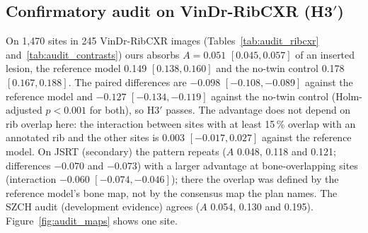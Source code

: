 \subsection{Confirmatory audit on VinDr-RibCXR (\texorpdfstring{H3$'$}{H3'})}
On 1,470 sites in 245 VinDr-RibCXR images (Tables~\ref{tab:audit_ribcxr} and~\ref{tab:audit_contrasts}) ours absorbs $A=0.051$
$[0.045,0.057]$ of an inserted lesion, the reference model 0.149 $[0.138,0.160]$ and the no-twin control 0.178 $[0.167,0.188]$. The paired
differences are $-0.098$ $[-0.108,-0.089]$ against the reference model and $-0.127$ $[-0.134,-0.119]$ against the no-twin control
(Holm-adjusted $p<0.001$ for both), so H3$'$ passes. The advantage does not depend on rib overlap here: the interaction between sites with at
least 15\,\% overlap with an annotated rib and the other sites is $0.003$ $[-0.017,0.027]$ against the reference model. On JSRT (secondary)
the pattern repeats ($A$ 0.048, 0.118 and 0.121; differences $-0.070$ and $-0.073$) with a larger advantage at bone-overlapping sites
(interaction $-0.060$ $[-0.074,-0.046]$); there the overlap was defined by the reference model's bone map, not by the consensus map the plan
names. The SZCH audit (development evidence) agrees ($A$ 0.054, 0.130 and 0.195). Figure~\ref{fig:audit_maps} shows one site.

